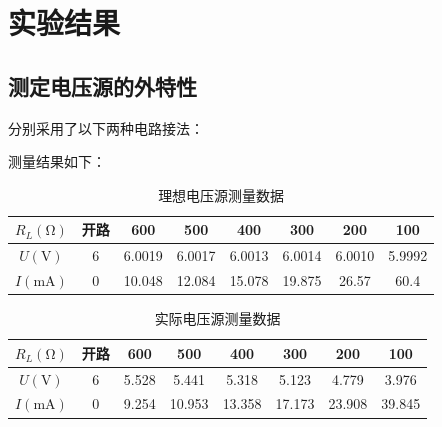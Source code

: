 \documentclass[a4paper,utf8]{article}
\begin{document}
\section{实验结果}
    \subsection{测定电压源的外特性}\newpage
        分别采用了以下两种电路接法：\par
        \begin{figure}[!ht]
            \hspace{5mm}
        \end{figure}\par
        测量结果如下：\par
        \begin{table}[!ht]
            \centering\begin{tabular}{c c c c c c c c}\toprule
                $R_L (\unit{\ohm})$ & 开路 & 600 & 500 & 400 & 300 & 200 & 100 \\ \midrule
                $U (\unit{\V})$ & 6 & 6.0019 & 6.0017 & 6.0013 & 6.0014 & 6.0010 & 5.9992 \\
                $I (\unit{\mA})$ & 0 & 10.048 & 12.084 & 15.078 & 19.875 & 26.57 & 60.4 \\ \bottomrule
            \end{tabular}\caption{理想电压源测量数据}
        \end{table}\par
        \begin{table}[!ht]
            \centering\begin{tabular}{c c c c c c c c}\toprule
                $R_L (\unit{\ohm})$ & 开路 & 600 & 500 & 400 & 300 & 200 & 100 \\ \midrule
                $U (\unit{\V})$ & 6 & 5.528 & 5.441 & 5.318 & 5.123 & 4.779 & 3.976 \\
                $I (\unit{\mA})$ & 0 & 9.254 & 10.953 & 13.358 & 17.173 & 23.908 & 39.845 \\ \bottomrule
            \end{tabular}\caption{实际电压源测量数据}
        \end{table}\par
\end{document}
